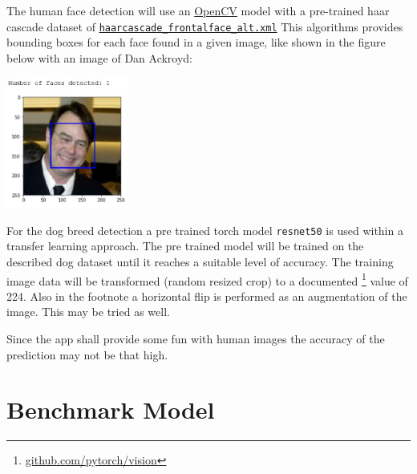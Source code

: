 \documentclass[paper=A4, DIV=10, parskip=half]{scrartcl}
\begin{document}
The human face detection will use an \href{https://opencv.org/}{OpenCV} model with a
pre-trained haar cascade dataset of
\href{https://github.com/opencv/opencv/blob/master/data/haarcascades/haarcascade_frontalface_alt.xml}{\texttt{haarcascade\_frontalface\_alt.xml}}
This algorithms provides bounding boxes for each face found in a given image, like shown
in the figure below with an image of Dan Ackroyd:

\begin{center}
  \includegraphics[width=4cm]{images/dan_ackroyd_bounding_box.jpg}
\end{center}

For the dog breed detection a pre trained torch model \texttt{resnet50} is used within a
transfer learning approach. The pre trained model will be trained on the described dog
dataset until it reaches a suitable level of accuracy. The training image data will be
transformed (random resized crop) to a documented
\footnote{\href{https://github.com/pytorch/vision/issues/39}{github.com/pytorch/vision}}
value of 224. Also in the footnote a horizontal flip is performed as an augmentation of
the image. This may be tried as well. 

Since the app shall provide some fun with human images the accuracy of the prediction may
not be that high.




\section*{Benchmark Model}
\end{document}

